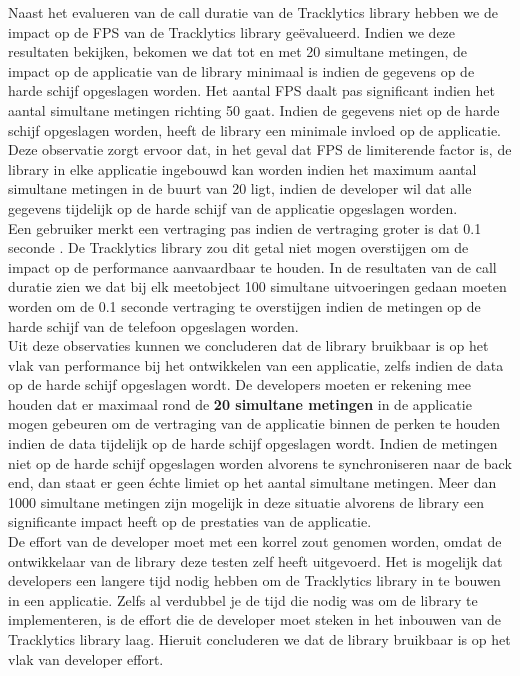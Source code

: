 Naast het evalueren van de call duratie van de Tracklytics library hebben we de impact op de FPS van de Tracklytics library ge\"evalueerd. Indien we deze resultaten bekijken, bekomen we dat tot en met 20 simultane metingen, de impact op de applicatie van de library minimaal is indien de gegevens op de harde schijf opgeslagen worden. Het aantal FPS daalt pas significant indien het aantal simultane metingen richting 50 gaat. Indien de gegevens niet op de harde schijf opgeslagen worden, heeft de library een minimale invloed op de applicatie. Deze observatie zorgt ervoor dat, in het geval dat FPS de limiterende factor is, de library in elke applicatie ingebouwd kan worden indien het maximum aantal simultane metingen in de buurt van 20 ligt, indien de developer wil dat alle gegevens tijdelijk op de harde schijf van de applicatie opgeslagen worden. \\ 

Een gebruiker merkt een vertraging pas indien de vertraging groter is dat 0.1 seconde \cite{nielsen1994usability}. De Tracklytics library zou dit getal niet mogen overstijgen om de impact op de performance aanvaardbaar te houden. In de resultaten van de call duratie zien we dat bij elk meetobject 100 simultane uitvoeringen gedaan moeten worden om de 0.1 seconde vertraging te overstijgen indien de metingen op de harde schijf van de telefoon opgeslagen worden. \\


Uit deze observaties kunnen we concluderen dat de library bruikbaar is op het vlak van performance bij het ontwikkelen van een applicatie, zelfs indien de data op de harde schijf opgeslagen wordt. De developers moeten er rekening mee houden dat er maximaal rond de \textbf{20 simultane metingen} in de applicatie mogen gebeuren om de vertraging van de applicatie binnen de perken te houden indien de data tijdelijk op de harde schijf opgeslagen wordt. Indien de metingen niet op de harde schijf opgeslagen worden alvorens te synchroniseren naar de back end, dan staat er geen \'echte limiet op het aantal simultane metingen. Meer dan 1000 simultane metingen zijn mogelijk in deze situatie alvorens de library een significante impact heeft op de prestaties van de applicatie. \\

De effort van de developer moet met een korrel zout genomen worden, omdat de ontwikkelaar van de library deze testen zelf heeft uitgevoerd. Het is mogelijk dat developers een langere tijd nodig hebben om de Tracklytics library in te bouwen in een applicatie. Zelfs al verdubbel je de tijd die nodig was om de library te implementeren, is de effort die de developer moet steken in het inbouwen van de Tracklytics library laag. Hieruit concluderen we dat de library bruikbaar is op het vlak van developer effort. \\


